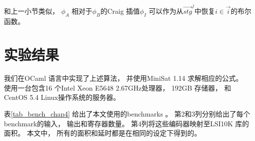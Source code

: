 和上一小节类似，
$\phi_A$ 相对于$\phi_B$的Craig 插值$\phi_I$
可以作为从$\vec{stg}^j$中恢复$i\in\vec{i}$的布尔函数。



\section{实验结果}\label{sec_exp_chap4}
我们在OCaml 语言中实现了上述算法，
并使用MiniSat 1.14 求解相应的公式。
使用一台包含16 个Intel Xeon E5648 2.67GHz处理器，
192GB 存储器， 和CentOS 5.4 Linux操作系统的服务器。

表\ref{tab_bench_chap4} 给出了本文使用的benchmarks 。
第2和3列分别给出了每个benchmark的输入， 输出和寄存器数量。
第4列将这些编码器映射至LSI10K 库的面积。
本文中，
所有的面积和延时都是在相同的设定下得到的。



